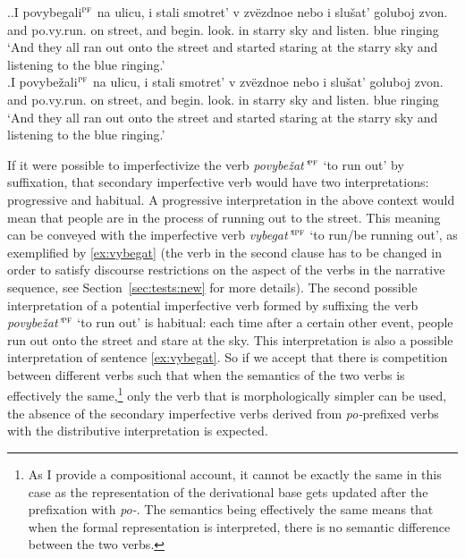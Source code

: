 \ex.\label{ex:povy}\ag.\label{ex:povybegat}I povybegali$^{\textsc{pf}}$ na ulicu, i stali smotret' v zv\"{e}zdnoe nebo i slu\v{s}at' goluboj zvon.\\
and po.vy.run. on street, and begin. look. in starry sky and listen. blue ringing\\
\trans `And they all ran out onto the street and started staring at the starry sky and listening to the blue ringing.'\\
\bg.\label{ex:povybezhat}I povybe\v{z}ali$^{\textsc{pf}}$ na ulicu, i stali smotret' v zv\"{e}zdnoe nebo i slu\v{s}at' goluboj zvon.\\
and po.vy.run. on street, and begin. look. in starry sky and listen. blue ringing\\
\trans `And they all ran out onto the street and started staring at the starry sky and listening to the blue ringing.'

If it were possible to imperfectivize the verb \textit{povybe\v{z}at'}$^{\textsc{pf}}$ `to run out'  by suffixation, that secondary imperfective verb would have two interpretations: progressive and habitual. A progressive interpretation in the above context would mean that people are in the process of running out to the street. This meaning can be conveyed with the imperfective verb \textit{vybegat'}$^{\textsc{ipf}}$ `to run/be running out', as exemplified by \ref{ex:vybegat} (the verb in the second clause has to be changed in order to satisfy discourse restrictions on the aspect of the verbs in the narrative sequence, see Section~\ref{sec:tests:new} for more details). The second possible interpretation of a potential imperfective verb formed by suffixing the verb \textit{povybe\v{z}at'}$^{\textsc{pf}}$ `to run out' is habitual: each time after a certain other event, people run out onto the street and stare at the sky. This interpretation is also a possible interpretation of sentence \ref{ex:vybegat}. So if we accept that there is competition between different verbs such that when the semantics of the two verbs is effectively the same,\footnote{As I provide a compositional account, it cannot be exactly the same in this case as the representation of the derivational base gets updated after the prefixation with \textit{po-}. The semantics being effectively the same means that when the formal representation is interpreted, there is no semantic difference between the two verbs.} only the verb that is morphologically simpler can be used, the absence of the secondary imperfective verbs derived from \textit{po-}prefixed verbs with the distributive interpretation is expected.

